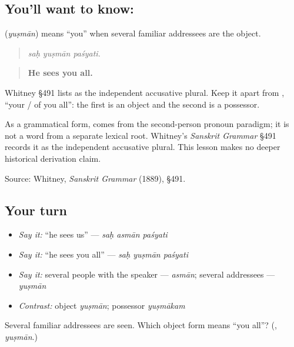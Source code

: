 \subsection*{You'll want to know: }
\textbf{} (\emph{yuṣmān}) means “you” when several familiar addressees are the object.

\begin{quote}
\textbf{  }
\end{quote}

\begin{quote}
\emph{saḥ yuṣmān paśyati.}
\end{quote}

\begin{quote}
\textbf{He sees you all.}
\end{quote}

Whitney §491 lists \textbf{} as the independent accusative plural. Keep it apart from \textbf{}, “your / of you all”: the first is an object and the second is a possessor.

\begin{cousinweb}
As a grammatical form, \textbf{} comes from the second-person pronoun paradigm; it is not a word from a separate lexical root. Whitney's \emph{Sanskrit Grammar} §491 records it as the independent accusative plural. This lesson makes no deeper historical derivation claim.

Source: Whitney, \emph{Sanskrit Grammar} (1889), §491.
\end{cousinweb}

\subsection*{Your turn}
\begin{itemize}
\raggedright
  \item \emph{Say it:} “he sees us” — \emph{saḥ asmān paśyati}
  \item \emph{Say it:} “he sees you all” — \emph{saḥ yuṣmān paśyati}
  \item \emph{Say it:} several people with the speaker — \emph{asmān}; several addressees — \emph{yuṣmān}
  \item \emph{Contrast:} object \emph{yuṣmān}; possessor \emph{yuṣmākam}
\end{itemize}

\begin{tcolorbox}[breakable,colback=teal!4,colframe=teal!35!black,title={Before you move on}]
Several familiar addressees are seen. Which object form means “you all”? (\textbf{}, \emph{yuṣmān}.)
\end{tcolorbox}
